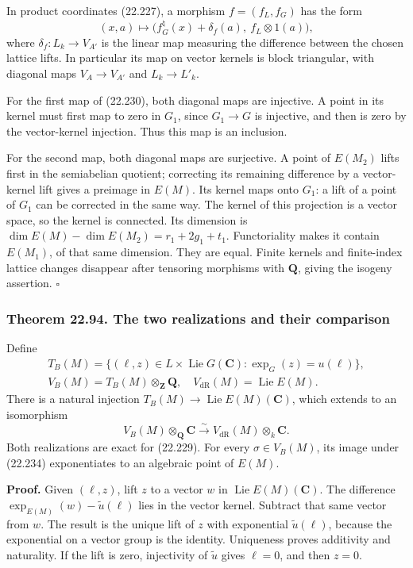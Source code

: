 \documentclass[
  11pt,
  a4paper,
]{article}
\begin{document}
In product coordinates (22.227), a morphism \(f=(f_L,f_G)\) has the form
\[
 (x,a)\longmapsto
 \bigl(f_G^\natural(x)+\delta_f(a),\ f_L\otimes1(a)\bigr),
 \tag{22.232}
\] where \(\delta_f:L_k\to V_{A'}\) is the linear map measuring the
difference between the chosen lattice lifts. In particular its map on
vector kernels is block triangular, with diagonal maps \(V_A\to V_{A'}\)
and \(L_k\to L'_k\).

For the first map of (22.230), both diagonal maps are injective. A point
in its kernel must first map to zero in \(G_1\), since \(G_1\to G\) is
injective, and then is zero by the vector-kernel injection. Thus this
map is an inclusion.

For the second map, both diagonal maps are surjective. A point of
\(E(M_2)\) lifts first in the semiabelian quotient; correcting its
remaining difference by a vector-kernel lift gives a preimage in
\(E(M)\). Its kernel maps onto \(G_1\): a lift of a point of \(G_1\) can
be corrected in the same way. The kernel of this projection is a vector
space, so the kernel is connected. Its dimension is
\(\dim E(M)-\dim E(M_2)=r_1+2g_1+t_1\). Functoriality makes it contain
\(E(M_1)\), of that same dimension. They are equal. Finite kernels and
finite-index lattice changes disappear after tensoring morphisms with
\(\mathbf Q\), giving the isogeny assertion. \(\square\)

\subsubsection{Theorem 22.94. The two realizations and their
comparison}\label{theorem-22.94.-the-two-realizations-and-their-comparison}

Define \[
\begin{gathered}
 T_B(M)=\{(\ell,z)\in L\times\operatorname{Lie}G(\mathbf C):
                   \exp_G(z)=u(\ell)\},\\
 V_B(M)=T_B(M)\otimes_{\mathbf Z}\mathbf Q,\quad
 V_{\mathrm{dR}}(M)=\operatorname{Lie}E(M).
\end{gathered}
\tag{22.233}
\] There is a natural injection
\(T_B(M)\to\operatorname{Lie}E(M)(\mathbf C)\), which extends to an
isomorphism \[
 V_B(M)\otimes_{\mathbf Q}\mathbf C
   \xrightarrow{\;\sim\;}
 V_{\mathrm{dR}}(M)\otimes_k\mathbf C.
 \tag{22.234}
\] Both realizations are exact for (22.229). For every
\(\sigma\in V_B(M)\), its image under (22.234) exponentiates to an
algebraic point of \(E(M)\).

\textbf{Proof.} Given \((\ell,z)\), lift \(z\) to a vector \(w\) in
\(\operatorname{Lie}E(M)(\mathbf C)\). The difference
\(\exp_{E(M)}(w)-\widetilde u(\ell)\) lies in the vector kernel.
Subtract that same vector from \(w\). The result is the unique lift of
\(z\) with exponential \(\widetilde u(\ell)\), because the exponential
on a vector group is the identity. Uniqueness proves additivity and
naturality. If the lift is zero, injectivity of \(\widetilde u\) gives
\(\ell=0\), and then \(z=0\).
\end{document}
